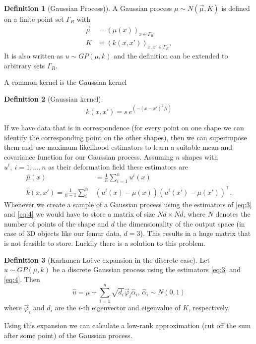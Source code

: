 \documentclass[10pt]{article}
\theoremstyle{definition}
\newtheorem{definition}{Definition}[section]
\begin{document}
\begin{definition}[Gaussian Process)]
A Gaussian process $\mu \sim N(\vec{\mu},K)$ is defined on a finite point set $\Gamma_R$
with
\begin{align}\label{eq:1}
\vec{\mu} &= \left(\mu(x)\right)_{x\in\Gamma_R}\\
        K &= \left(k(x,x')\right)_{x,x'\in\Gamma_R},\label{eq:2}
\end{align}
It is also written as $u\sim GP(\mu,k)$ and the definition can be extended to arbitrary sets $\Gamma_R$.
\end{definition}
A common kernel is the Gaussian kernel
\begin{definition}[Gaussian kernel]
\begin{equation}\label{eq:gausskernel}
k(x,x') = s\ e^{(-(x-x')^2/l)}
\end{equation}

\end{definition}


If we have data that is in correspondence (for every point on one shape we can identify the corresponding point on the other shapes), then we can superimpose them and use maximum likelihood estimators to learn a suitable mean and covariance function for our Gaussian process. Assuming $n$ shapes with $u^i,\ i=1,\dots,n$ as their deformation field these estimators are
\begin{align}
\hat\mu(x) &= \frac{1}{n}\sum_{i=1}^n u^i(x)\label{eq:3}\\
\hat k(x,x') = \frac{1}{n-1}\sum_{i}^n &(u^i(x) - \mu(x))(u^i(x') - \mu(x'))^\top.\label{eq:4}
\end{align}
Whenever we create a sample of a Gaussian process using the estimators of \eqref{eq:3} and \eqref{eq:4} we
would have to store a matrix of size $Nd \times Nd$, where $N$ denotes the number of points of the shape and $d$ the dimensionality of the output space (in case of 3D objects like our femur data, $d=3$). This results in a huge matrix that is not feasible to store. Luckily there is a solution to this problem.

\begin{definition}[Karhunen-Loève expansion in the discrete case]
Let $u \sim GP(\mu,k)$ be a discrete Gaussian process using the estimators \eqref{eq:3} and \eqref{eq:4}. Then
\begin{equation}
\hat u = \mu + \sum_{i=1}^n \sqrt{d_i}\vec{\varphi}_i\hat \alpha_i,\, \hat \alpha_i\sim N(0,1)
\end{equation}
where $\vec{\varphi}_i$ and $d_i$ are the $i$-th eigenvector and eigenvalue of $K$, respectively.
\end{definition}
\noindent
Using this expansion we can calculate a low-rank approximation (cut off the sum after some point) of the Gaussian process.
\end{document}
